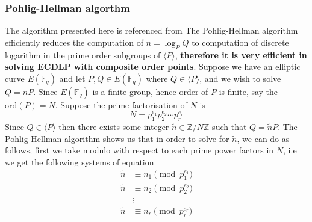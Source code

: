 \documentclass[a4 paper]{article}
\newcommand{\?}{\stackrel{?}{=}}
\begin{document}
\subsubsection{Pohlig-Hellman algorthm}
The algorithm presented here is referenced from \cite[\S 4.1.1]{hankerson2006guide}
The Pohlig-Hellman algorithm efficiently reduces the computation of $ n = \log_P Q $ to computation of discrete logarithm in the prime order subgroups of $ \langle P \rangle $, \textbf{therefore it is very efficient in solving ECDLP with composite order points}. Suppose we have an elliptic curve $ E(\mathbb{F}_q) $ and let $ P, Q \in E(\mathbb{F}_q) $ where $ Q \in \langle P \rangle $, and we wish to solve $ Q = nP $. Since $ E(\mathbb{F}_q) $ is a finite group, hence order of $ P $ is finite, say the $ \text{ord}(P) = N $. Suppose the prime factorisation of $ N $ is 
$$ N = p_1 ^{e_1 } p_2 ^{e_2 } \cdots p_r^{e_r} $$
Since $ Q \in \langle P \rangle $ then there exists some integer $ \tilde{n}\in \mathbb{Z} / N \mathbb{Z} $ such that $ Q = \tilde{n}P  $. The Pohlig-Hellman algorithm shows us that in order to solve for $ \tilde{n}$, we can do as follows, first we take modulo with respect to each prime power factors in $ N $, i.e we get the following systems of equation 
\begin{align*}
    \tilde{n}& \equiv n_1\pmod{p_1^{e_1 }} \\ 
    \tilde{n} &\equiv  n_2 \pmod {p_2 ^{e_2 }} \\ 
    &\vdots \\ 
    \tilde{n} & \equiv n_r \pmod{p_r^{e_r}}
\end{align*}
\end{document}
